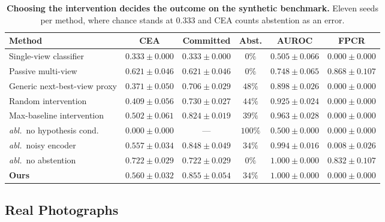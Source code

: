 \documentclass{article} %
\theoremstyle{defstyle}
\theoremstyle{plain}
\begin{document}
\begin{table}[t]
\caption{\textbf{Choosing the intervention decides the outcome on the synthetic benchmark.} Eleven
seeds per method, where chance stands at $0.333$ and CEA counts abstention as an error.}
\label{tab:phase1}
\begin{center}
\footnotesize
\begin{tabular}{lccccc}
\toprule
\textbf{Method} & \textbf{CEA} & \textbf{Committed} & \textbf{Abst.} &
\textbf{AUROC} & \textbf{FPCR} \\
\midrule
Single-view classifier    & $0.333{\pm}0.000$ & $0.333{\pm}0.000$ & $0\%$  & $0.505{\pm}0.066$ & $0.000{\pm}0.000$ \\
Passive multi-view        & $0.621{\pm}0.046$ & $0.621{\pm}0.046$ & $0\%$  & $0.748{\pm}0.065$ & $0.868{\pm}0.107$ \\
Generic next-best-view proxy & $0.371{\pm}0.050$ & $0.706{\pm}0.029$ & $48\%$ & $0.898{\pm}0.026$ & $0.000{\pm}0.000$ \\
Random intervention       & $0.409{\pm}0.056$ & $0.730{\pm}0.027$ & $44\%$ & $0.925{\pm}0.024$ & $0.000{\pm}0.000$ \\
Max-baseline intervention & $0.502{\pm}0.061$ & $0.824{\pm}0.019$ & $39\%$ & $0.963{\pm}0.028$ & $0.000{\pm}0.000$ \\
\midrule
\emph{abl.}\ no hypothesis cond. & $0.000{\pm}0.000$ & --- & $100\%$ & $0.500{\pm}0.000$ & $0.000{\pm}0.000$ \\
\emph{abl.}\ noisy encoder       & $0.557{\pm}0.034$ & $0.848{\pm}0.049$ & $34\%$ & $0.994{\pm}0.016$ & $0.008{\pm}0.026$ \\
\emph{abl.}\ no abstention       & $\mathbf{0.722{\pm}0.029}$ & $0.722{\pm}0.029$ & $0\%$ & $1.000{\pm}0.000$ & $0.832{\pm}0.107$ \\
\textbf{Ours} & $0.560{\pm}0.032$ & $\mathbf{0.855{\pm}0.054}$ & $34\%$ & $1.000{\pm}0.000$ & $\mathbf{0.000{\pm}0.000}$ \\
\bottomrule
\end{tabular}
\end{center}
\end{table}

\subsection{Real Photographs}
\label{sec:res-universal}
\end{document}
